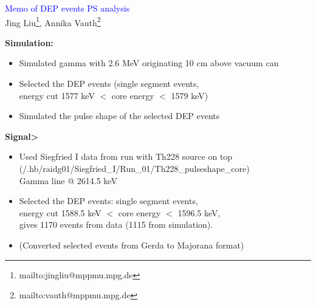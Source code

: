 \documentclass[landscape]{slides}
\begin{document}
\begin{slide}
\begin{center}
\textcolor{blue}{Memo of DEP events PS analysis}\\
Jing Liu\footnote{mailto:jingliu@mppmu.mpg.de},
Annika Vauth\footnote{mailto:vauth@mppmu.mpg.de}

\end{center}

\end{slide}


\begin{slide}

\textbf{Simulation:}

\begin{itemize}

\item Simulated gamma with 2.6 MeV originating 10 cm above vacuum can

\item Selected the DEP events (single segment events,
	\\ energy cut 1577 keV $<$ core energy $<$ 1579 keV)

\item Simulated the pulse shape of the selected DEP events

\end{itemize}

\end{slide}

\begin{slide}

\textbf{Signal>}

\begin{itemize}

\item Used Siegfried I data from run with Th228 source on top
	\\ (/.hb/raidg01/Siegfried\_I/Run\_01/Th228\_pulseshape\_core)
	\\ Gamma line @ 2614.5 keV

\item Selected the DEP events: single segment events,
	\\ energy cut 1588.5 keV $<$ core energy $<$ 1596.5 keV,\\
	gives 1170 events from data (1115 from simulation).

\item (Converted selected events from Gerda to Majorana format)

\end{itemize}

\end{slide}
\end{document}
